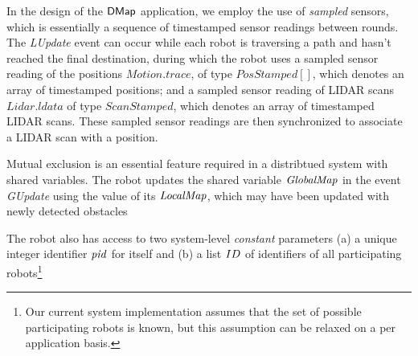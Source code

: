 In the design of the ${\sf DMap}$ application, we employ the use of \emph{sampled} sensors, which is essentially a sequence of timestamped sensor readings between rounds. The \emph{LUpdate} event can occur while each robot is traversing a path and hasn't reached the final destination, during which the robot uses a sampled sensor reading of the positions $\mathit{Motion.trace}$, of type $\mathit{PosStamped}[]$, which denotes an array of timestamped positions; and a sampled sensor reading of LIDAR scans $\mathit{Lidar.ldata}$ of type $\mathit{ScanStamped}$, which denotes an array of timestamped LIDAR scans. These sampled sensor readings are then synchronized to associate a LIDAR scan with a position.


Mutual exclusion is an essential feature required in a distribtued system with shared variables. The robot updates the shared variable $\mathit{GlobalMap}$ in the event \emph{GUpdate} using the value of its $\mathit{LocalMap}$, which may have been updated with newly detected obstacles

The robot also has access to two system-level \emph{constant} parameters (a) a unique integer identifier $\mathit{pid}$ for itself and (b) a list $ID$ of identifiers of all participating robots\footnote{Our current system implementation assumes that the set of possible participating robots is known, but this assumption can be relaxed on a per application basis.}


